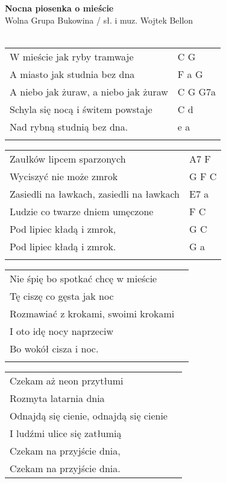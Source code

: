 \documentclass[a5paper]{article}
\begin{document}


\noindent
\noindent
\fontsize{12pt}{15pt}\selectfont
\textbf{Nocna piosenka o mieście} \\
\fontsize{8pt}{10pt}\selectfont
Wolna Grupa Bukowina / sł. i muz. Wojtek Bellon \\ \\
\fontsize{10pt}{12pt}\selectfont

\noindent
\begin{tabular}{@{}p{7.00cm}p{3cm}@{}}
W mieście jak ryby tramwaje & C G \\
A miasto jak studnia bez dna & F a G \\
A niebo jak żuraw, a niebo jak żuraw & C G G7a \\
Schyla się nocą i świtem powstaje & C d \\
Nad rybną studnią bez dna. & e a \\ \\
\end{tabular}

\noindent
\begin{tabular}{@{}p{8.00cm}p{3cm}@{}}
	Zaułków lipcem sparzonych & A7 F \\
	Wyciszyć nie może zmrok	& G F C	\\
	Zasiedli na ławkach, zasiedli na ławkach & E7 a \\
	Ludzie co twarze dniem umęczone	& F C \\
	Pod lipiec kładą i zmrok, & G C \\
	Pod lipiec kładą i zmrok. & G a \\ \\
\end{tabular}

\noindent
\begin{tabular}{@{}p{8.00cm}p{3cm}@{}}
	Nie śpię bo spotkać chcę w mieście & \\
	Tę ciszę co gęsta jak noc & \\
	Rozmawiać z krokami, swoimi krokami & \\
	I oto idę nocy naprzeciw & \\
	Bo wokół cisza i noc. & \\ \\
\end{tabular}

\noindent
\begin{tabular}{@{}p{8.00cm}p{3cm}@{}}
	Czekam aż neon przytłumi & \\
	Rozmyta latarnia dnia & \\
	Odnajdą się cienie, odnajdą się cienie & \\
	I ludźmi ulice się zatłumią	& \\
	Czekam na przyjście dnia, & \\
	Czekam na przyjście dnia. &
\end{tabular}
\end{document}
